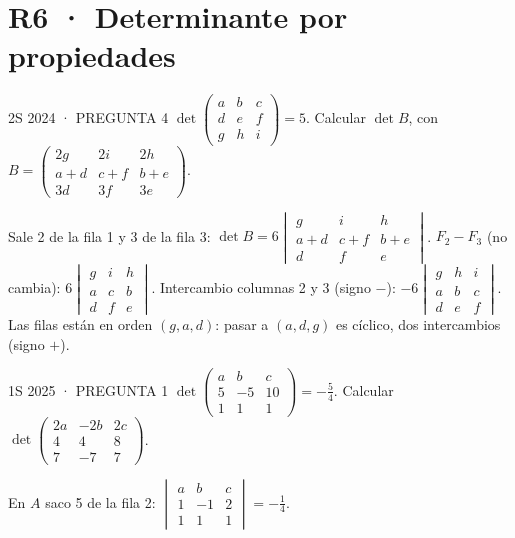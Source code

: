 \section*{R6 · Determinante por propiedades}
\begin{enunciado}{2S 2024 · PREGUNTA 4}
$\det\begin{pmatrix}a&b&c\\d&e&f\\g&h&i\end{pmatrix}=5$. Calcular $\det B$, con $B=\begin{pmatrix}2g&2i&2h\\a+d&c+f&b+e\\3d&3f&3e\end{pmatrix}$.
\end{enunciado}
Sale 2 de la fila 1 y 3 de la fila 3: $\det B=6\begin{vmatrix}g&i&h\\a+d&c+f&b+e\\d&f&e\end{vmatrix}$.
$F_2-F_3$ (no cambia): $6\begin{vmatrix}g&i&h\\a&c&b\\d&f&e\end{vmatrix}$.
Intercambio columnas 2 y 3 (signo $-$): $-6\begin{vmatrix}g&h&i\\a&b&c\\d&e&f\end{vmatrix}$. Las filas están en orden $(g,a,d)$: pasar a $(a,d,g)$ es cíclico, dos intercambios (signo $+$).
\begin{enunciado}{1S 2025 · PREGUNTA 1}
$\det\begin{pmatrix}a&b&c\\5&-5&10\\1&1&1\end{pmatrix}=-\frac54$. Calcular $\det\begin{pmatrix}2a&-2b&2c\\4&4&8\\7&-7&7\end{pmatrix}$.
\end{enunciado}
En $A$ saco 5 de la fila 2: $\begin{vmatrix}a&b&c\\1&-1&2\\1&1&1\end{vmatrix}=-\frac14$.\\
